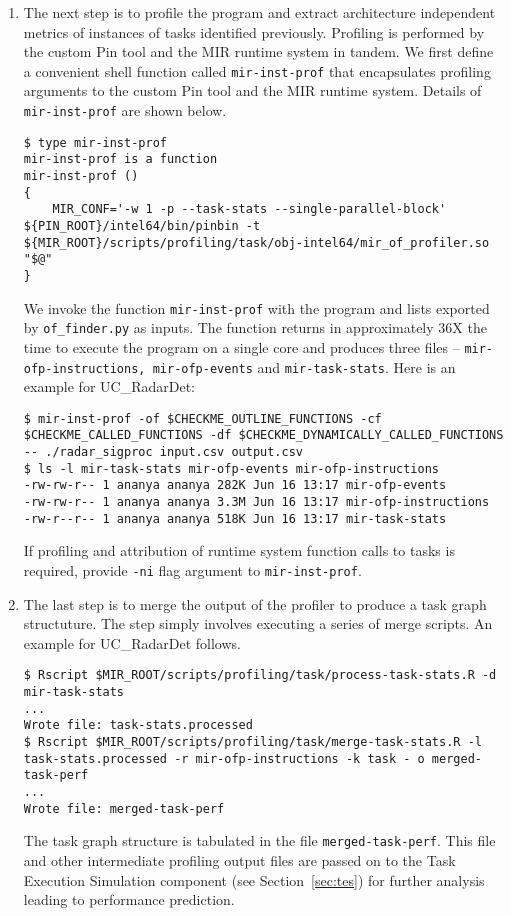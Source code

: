 \documentclass[11pt,a4paper]{article}
\begin{document}
\begin{enumerate}
    \item The next step is to profile the program and extract architecture independent metrics of instances of tasks identified previously. Profiling is performed by the custom Pin tool and the MIR runtime system in tandem. We first define a convenient shell function called \texttt{mir-inst-prof} that encapsulates profiling arguments to the custom Pin tool and the MIR runtime system. Details of \texttt{mir-inst-prof} are shown below.

\begin{lstlisting}[style=MyInputStyle]
$ type mir-inst-prof 
mir-inst-prof is a function
mir-inst-prof () 
{ 
    MIR_CONF='-w 1 -p --task-stats --single-parallel-block' ${PIN_ROOT}/intel64/bin/pinbin -t ${MIR_ROOT}/scripts/profiling/task/obj-intel64/mir_of_profiler.so "$@"
}
\end{lstlisting}

We invoke the function \texttt{mir-inst-prof} with the program and lists exported by \texttt{of\_finder.py} as inputs. The function returns in approximately 36X  the time to execute the program on a single core and produces three files -- \texttt{mir-ofp-instructions, mir-ofp-events} and \texttt{mir-task-stats}. Here is an example for UC\_RadarDet:

\begin{lstlisting}[style=MyInputStyle]
$ mir-inst-prof -of $CHECKME_OUTLINE_FUNCTIONS -cf $CHECKME_CALLED_FUNCTIONS -df $CHECKME_DYNAMICALLY_CALLED_FUNCTIONS -- ./radar_sigproc input.csv output.csv
$ ls -l mir-task-stats mir-ofp-events mir-ofp-instructions
-rw-rw-r-- 1 ananya ananya 282K Jun 16 13:17 mir-ofp-events
-rw-rw-r-- 1 ananya ananya 3.3M Jun 16 13:17 mir-ofp-instructions
-rw-r--r-- 1 ananya ananya 518K Jun 16 13:17 mir-task-stats
\end{lstlisting}

If profiling and attribution of runtime system function calls to tasks is required, provide \texttt{-ni} flag argument to \texttt{mir-inst-prof}.

\item The last step is to merge the output of the profiler to produce a task graph structuture. The step simply involves executing a series of merge scripts. An example for UC\_RadarDet follows.

\begin{lstlisting}[style=MyInputStyle]
$ Rscript $MIR_ROOT/scripts/profiling/task/process-task-stats.R -d mir-task-stats
...
Wrote file: task-stats.processed
$ Rscript $MIR_ROOT/scripts/profiling/task/merge-task-stats.R -l task-stats.processed -r mir-ofp-instructions -k task - o merged-task-perf
...
Wrote file: merged-task-perf
\end{lstlisting}

The task graph structure is tabulated in the file \texttt{merged-task-perf}. This file and other intermediate profiling output files are passed on to the Task Execution Simulation component (see Section~\ref{sec:tes}) for further analysis leading to performance prediction.
\end{enumerate}
\end{document}
